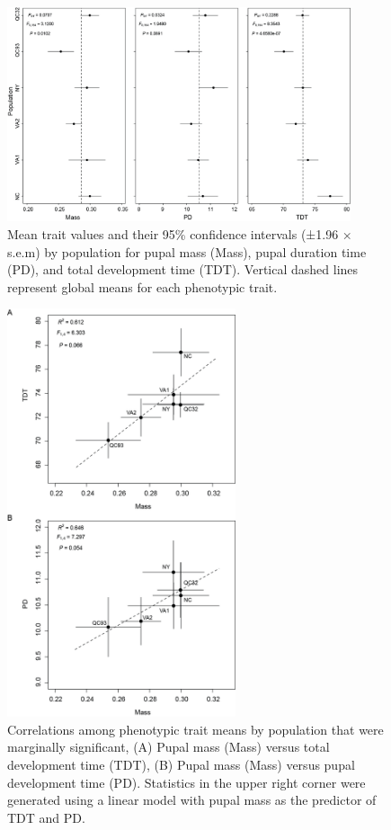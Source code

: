 
\begin{figure}
\centering
\includegraphics[width=0.9\textwidth]{media/image1.png}
\caption{Mean trait values and their 95\% confidence
intervals (±1.96 × s.e.m) by population for pupal mass (Mass), pupal
duration time (PD), and total development time (TDT). Vertical dashed
lines represent global means for each phenotypic trait.}
\label{fig:trait}
\end{figure}


\begin{figure}
\centering
\includegraphics[width=0.6\textwidth]{media/image2.png}
\caption{Correlations among phenotypic trait means by
population that were marginally significant, (A) Pupal mass (Mass)
versus total development time (TDT), (B) Pupal mass (Mass) versus pupal
development time (PD). Statistics in the upper right corner were
generated using a linear model with pupal mass as the predictor of TDT
and PD.}
\label{fig:traitcorr}
\end{figure}
